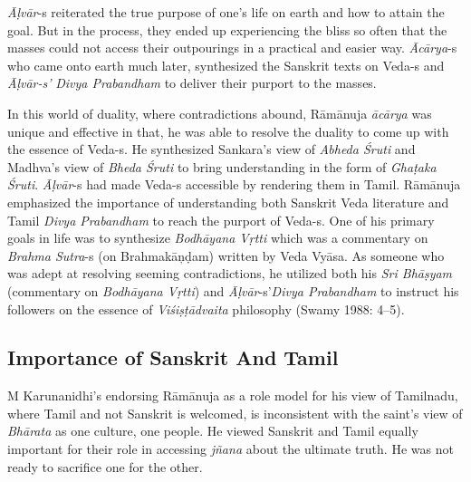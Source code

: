 \textit{Āḷvār}-s reiterated the true purpose of one’s life on earth and how to attain the goal. But in the process, they ended up experiencing the bliss so often that the masses could not access their outpourings in a practical and easier way. \textit{Ācārya}-s who came onto earth much later, synthesized the Sanskrit texts on Veda-s and \textit{Āḷvār-s’ }\textit{Divya Prabandham} to deliver their purport to the masses.

In this world of duality, where contradictions abound, Rāmānuja \textit{ācārya} was unique and effective in that, he was able to resolve the duality to come up with the essence of Veda-s. He synthesized Sankara’s view of \textit{Abheda Śruti} and Madhva’s view of \textit{Bheda Śruti} to bring understanding in the form of \textit{Ghaṭaka Śruti}. \textit{Āḷvār}-s had made Veda-s accessible by rendering them in Tamil. Rāmānuja emphasized the importance of understanding both Sanskrit Veda literature and Tamil \textit{Divya Prabandham} to reach the purport of Veda-s. One of his primary goals in life was to synthesize \textit{Bodhāyana Vṛtti} which was a commentary on \textit{Brahma Sutra}-s (on Brahmakāņḍam) written by Veda Vyāsa. As someone who was adept at resolving seeming contradictions, he utilized both his \textit{Sri Bhāṣyam} (commentary on \textit{Bodhāyana Vṛtti}) and \textit{Āḷvār}-s’\textit{Divya Prabandham} to instruct his followers on the essence of \textit{Viśiṣṭādvaita} philosophy (Swamy 1988: 4–5).

\vskip -20pt


\subsection*{Importance of Sanskrit And Tamil}

\vskip -6pt

M Karunanidhi’s endorsing Rāmānuja as a role model for his view of Tamilnadu, where Tamil and not Sanskrit is welcomed, is inconsistent with the saint’s view of \textit{Bhārata} as one culture, one people. He viewed Sanskrit and Tamil equally important for their role in accessing \textit{jñana} about the ultimate truth. He was not ready to sacrifice one for the other.

